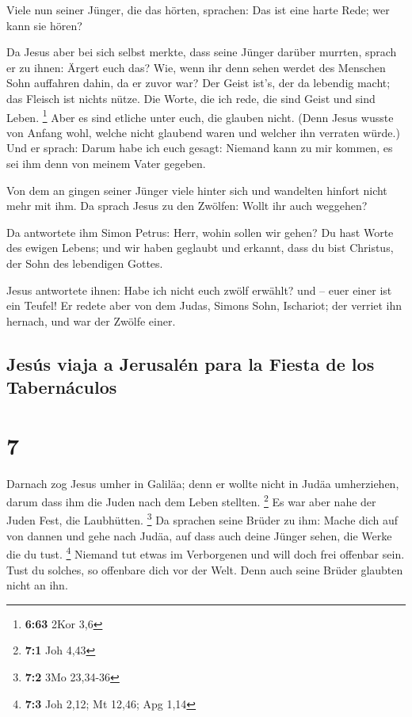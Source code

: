  Viele nun seiner Jünger, die das hörten, sprachen: Das
ist eine harte Rede; wer kann sie hören?

 Da Jesus aber bei sich selbst merkte, dass seine Jünger
darüber murrten, sprach er zu ihnen: Ärgert euch das? 
Wie, wenn ihr denn sehen werdet des Menschen Sohn auffahren dahin, da er
zuvor war?  Der Geist ist's, der da lebendig macht; das
Fleisch ist nichts nütze. Die Worte, die ich rede, die sind Geist und
sind Leben. \footnote{\textbf{6:63} 2Kor 3,6}  Aber es
sind etliche unter euch, die glauben nicht. (Denn Jesus wusste von
Anfang wohl, welche nicht glaubend waren und welcher ihn verraten
würde.)  Und er sprach: Darum habe ich euch gesagt:
Niemand kann zu mir kommen, es sei ihm denn von meinem Vater gegeben.

 Von dem an gingen seiner Jünger viele hinter sich und
wandelten hinfort nicht mehr mit ihm.  Da sprach Jesus zu
den Zwölfen: Wollt ihr auch weggehen?

 Da antwortete ihm Simon Petrus: Herr, wohin sollen wir
gehen? Du hast Worte des ewigen Lebens;  und wir haben
geglaubt und erkannt, dass du bist Christus, der Sohn des lebendigen
Gottes.

 Jesus antwortete ihnen: Habe ich nicht euch zwölf
erwählt? und -- euer einer ist ein Teufel!  Er redete
aber von dem Judas, Simons Sohn, Ischariot; der verriet ihn hernach, und
war der Zwölfe einer.

\hypertarget{jesuxfas-viaja-a-jerusaluxe9n-para-la-fiesta-de-los-tabernuxe1culos}{%
\subsection{Jesús viaja a Jerusalén para la Fiesta de los
Tabernáculos}\label{jesuxfas-viaja-a-jerusaluxe9n-para-la-fiesta-de-los-tabernuxe1culos}}

\hypertarget{section-6}{%
\section{7}\label{section-6}}

 Darnach zog Jesus umher in Galiläa; denn er wollte nicht
in Judäa umherziehen, darum dass ihm die Juden nach dem Leben stellten.
\footnote{\textbf{7:1} Joh 4,43}  Es war aber nahe der
Juden Fest, die Laubhütten. \footnote{\textbf{7:2} 3Mo 23,34-36}
 Da sprachen seine Brüder zu ihm: Mache dich auf von
dannen und gehe nach Judäa, auf dass auch deine Jünger sehen, die Werke
die du tust. \footnote{\textbf{7:3} Joh 2,12; Mt 12,46; Apg 1,14}
 Niemand tut etwas im Verborgenen und will doch frei
offenbar sein. Tust du solches, so offenbare dich vor der Welt.
 Denn auch seine Brüder glaubten nicht an ihn.

